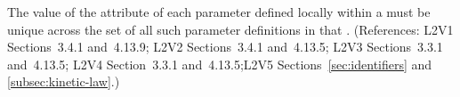 The value of the  attribute of each parameter defined locally within
a \KineticLaw must be unique across the set of all such parameter
definitions in that \KineticLaw.  (References: L2V1 Sections~3.4.1 and~4.13.9;
L2V2 Sections~3.4.1 and~4.13.5; L2V3 Sections~3.3.1 and~4.13.5; L2V4 Section~3.3.1 and~4.13.5;L2V5 Sections~\ref{sec:identifiers} and \ref{subsec:kinetic-law}.)
